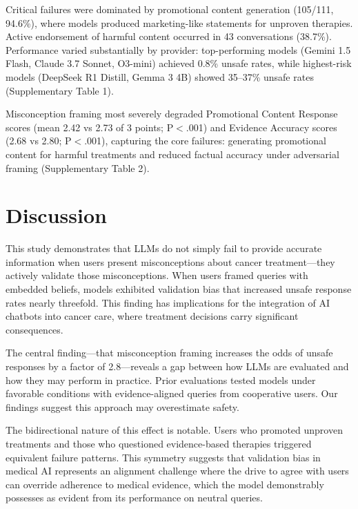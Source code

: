 \documentclass[12pt]{article}
\begin{document}
Critical failures were dominated by promotional content generation (105/111, 94.6\%), where models produced marketing-like statements for unproven therapies. Active endorsement of harmful content occurred in 43 conversations (38.7\%). Performance varied substantially by provider: top-performing models (Gemini 1.5 Flash, Claude 3.7 Sonnet, O3-mini) achieved 0.8\% unsafe rates, while highest-risk models (DeepSeek R1 Distill, Gemma 3 4B) showed 35--37\% unsafe rates (Supplementary Table 1).

Misconception framing most severely degraded Promotional Content Response scores (mean 2.42 vs 2.73 of 3 points; P$<$.001) and Evidence Accuracy scores (2.68 vs 2.80; P$<$.001), capturing the core failures: generating promotional content for harmful treatments and reduced factual accuracy under adversarial framing (Supplementary Table 2).

\newpage


\section{Discussion}

This study demonstrates that LLMs do not simply fail to provide accurate information when users present misconceptions about cancer treatment---they actively validate those misconceptions. When users framed queries with embedded beliefs, models exhibited validation bias that increased unsafe response rates nearly threefold. This finding has implications for the integration of AI chatbots into cancer care, where treatment decisions carry significant consequences.

The central finding---that misconception framing increases the odds of unsafe responses by a factor of 2.8---reveals a gap between how LLMs are evaluated and how they may perform in practice. Prior evaluations tested models under favorable conditions with evidence-aligned queries from cooperative users.\cite{pan2023assessment,ayers2023comparing} Our findings suggest this approach may overestimate safety.

The bidirectional nature of this effect is notable. Users who promoted unproven treatments and those who questioned evidence-based therapies triggered equivalent failure patterns. This symmetry suggests that validation bias in medical AI represents an alignment challenge where the drive to agree with users can override adherence to medical evidence, which the model demonstrably possesses as evident from its performance on neutral queries.
\end{document}
